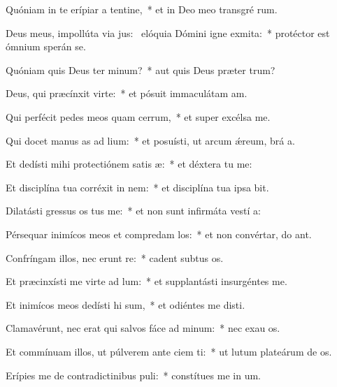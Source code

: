 \item Quóniam in te erípiar a tentine,~* et in Deo meo transgré rum.
\item Deus meus, impollúta via jus:~\pscross{} elóquia Dómini igne exmita:~* protéctor est ómnium sperán  se.
\item Quóniam quis Deus ter minum?~* aut quis Deus præter  trum?
\item Deus, qui præcínxit  virte:~* et pósuit immaculátam  am.
\item Qui perfécit pedes meos quam cerrum,~* et super excélsa  me.
\item Qui docet manus as ad lium:~* et posuísti, ut arcum ǽreum, brá a.
\item Et dedísti mihi protectiónem satis æ:~* et déxtera tu  me:
\item Et disciplína tua corréxit  in nem:~* et disciplína tua ipsa  bit.
\item Dilatásti gressus os tus me:~* et non sunt infirmáta vestí a:
\item Pérsequar inimícos meos et compredam los:~* et non convértar, do ant.
\item Confríngam illos, nec erunt re:~* cadent subtus  os.
\item Et præcinxísti me virte ad lum:~* et supplantásti insurgéntes    me.
\item Et inimícos meos dedísti hi sum,~* et odiéntes me disti.
\item Clamavérunt, nec erat qui salvos fáce ad minum:~* nec exau os.
\item Et commínuam illos, ut púlverem ante ciem ti:~* ut lutum plateárum de os.
\item Erípies me de contradictinibus puli:~* constítues me in  um.
